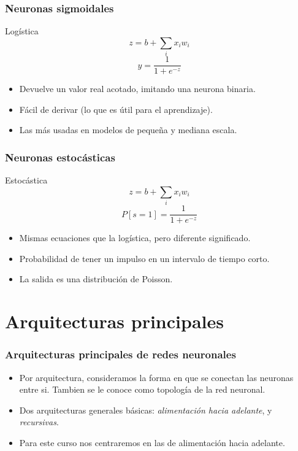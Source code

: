 \message{ !name(intro_rn.tex)}\documentclass{beamer}
\begin{document}
\begin{frame}
 \frametitle{Neuronas sigmoidales}
  \begin{block}{Logística}
      $$ z = b + \sum_{i} x_i w_i $$
      $$ y = \frac{1}{1 + e^{-z}}$$
  \end{block}
  
  \begin{itemize}
  \item Devuelve un valor real acotado, imitando una neurona binaria.
  \item Fácil de derivar (lo que es útil para el aprendizaje).
  \item Las más usadas en modelos de pequeña y mediana escala.
  \end{itemize}
\end{frame}

\begin{frame}
 \frametitle{Neuronas estocásticas}
  \begin{block}{Estocástica}
      $$ z = b + \sum_{i} x_i w_i $$
      $$ P[s=1] = \frac{1}{1 + e^{-z}}$$
  \end{block}
  
  \begin{itemize}
  \item Mismas ecuaciones que la logística, pero diferente significado.
  \item Probabilidad de tener un impulso en un intervalo de tiempo corto.
  \item La salida es una distribución de Poisson.
  \end{itemize}
\end{frame}




\section{Arquitecturas principales}

\begin{frame}
  \frametitle{Arquitecturas principales de redes neuronales}
  \begin{itemize}
  \item Por arquitectura, consideramos la forma en que se conectan las
    neuronas entre si. Tambien se le conoce como \alert{topología} de
    la red neuronal.
  \item Dos arquitecturas generales básicas: \emph{alimentación hacia
      adelante}, y \emph{recursivas}.
  \item Para este curso nos centraremos en las de alimentación hacia adelante.
  \end{itemize}
\end{frame}
\end{document}
